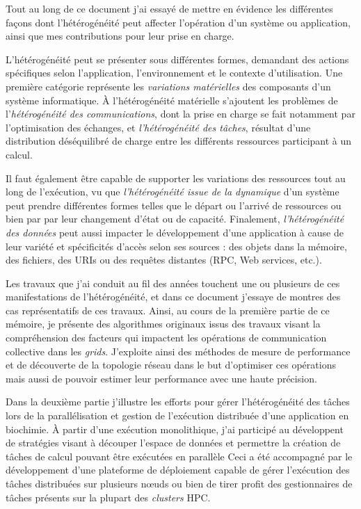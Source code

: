 
Tout au long de ce document j'ai essayé de mettre en évidence les différentes façons dont l'hétérogénéité peut affecter l'opération d'un système ou application, ainsi que mes contributions pour leur prise en charge.

L'hétérogénéité peut se présenter sous différentes formes, demandant des actions spécifiques selon l'application, l'environnement et le contexte d'utilisation. Une première catégorie représente les \textit{variations matérielles} des composants d'un système informatique. À l'hétérogénéité matérielle s'ajoutent les problèmes de l'\textit{hétérogénéité des communications}, dont la prise en charge se fait notamment par l'optimisation des échanges, et \textit{l'hétérogénéité des tâches}, résultat d'une distribution déséquilibré de charge entre les différents ressources participant à un calcul. 

Il faut également être capable de supporter les variations des ressources tout au long de l'exécution, vu que \textit{l'hétérogénéité issue de la dynamique} d'un système peut prendre différentes formes telles que le départ ou l'arrivé de ressources ou bien par par leur changement d'état ou de capacité. Finalement, \textit{l'hétérogénéité des données} peut aussi impacter le développement d'une application à cause de leur variété et spécificités d'accès selon ses sources : des objets dans la mémoire, des fichiers, des URIs ou des requêtes distantes (RPC, Web services, etc.). 

Les travaux que j'ai conduit au fil des années touchent une ou plusieurs de ces manifestations de l'hétérogénéité, et dans ce document j'essaye de montres des cas représentatifs de ces travaux. 
Ainsi, au cours de la première partie de ce mémoire, je présente des algorithmes originaux issus des travaux visant la compréhension des facteurs qui impactent les opérations de communication collective dans les \textit{grids}. J'exploite ainsi des méthodes de mesure de performance et de découverte de la topologie réseau dans le but  d'optimiser ces opérations mais aussi de pouvoir estimer leur performance avec une haute précision. 

Dans la deuxième partie j'illustre les efforts pour gérer l'hétérogénéité des tâches lors de la parallélisation et gestion de l'exécution distribuée d'une application en biochimie. À partir d'une exécution monolithique, j'ai participé au développent de stratégies visant à découper  l'espace de données et permettre la création de tâches de calcul pouvant être exécutées en parallèle Ceci a été accompagné par le développement d'une plateforme de déploiement capable de gérer l'exécution des tâches distribuées sur plusieurs n{\oe}uds ou bien de tirer profit des gestionnaires de tâches présents sur la plupart des \textit{clusters} HPC. 

